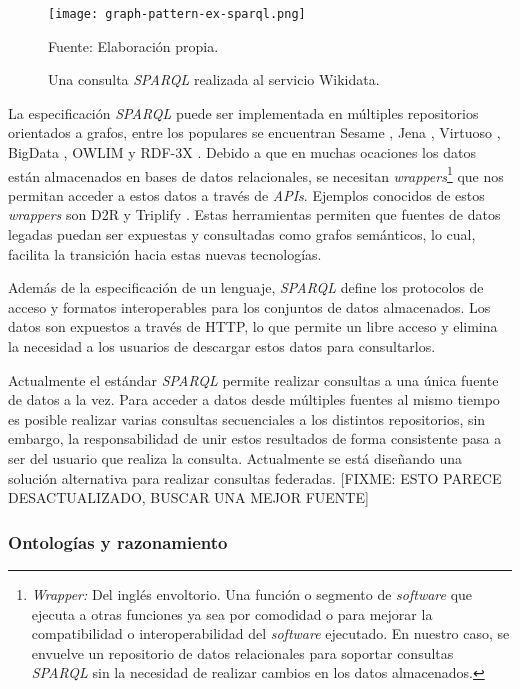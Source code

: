 \begin{figure}
    \centering
    \texttt{[image: graph-pattern-ex-sparql.png]}
    \caption{Una consulta \textit{SPARQL} realizada al servicio Wikidata.}
    Fuente: Elaboración propia.
    \label{fig:graph-pattern-ex-sparql}
\end{figure}

La especificación \textit{SPARQL} puede ser implementada en múltiples
repositorios orientados a grafos, entre los populares se encuentran Sesame
\cite{broekstra2002sesame}, Jena \cite{mcbride2001jena}, Virtuoso
\cite{openlink2015virtuoso}, BigData \cite{thompson2016bigdata}, OWLIM
\cite{kiryakov2005owlim} y RDF-3X \cite{neumann2010rdf}. Debido a que en muchas
ocaciones los datos están almacenados en bases de datos relacionales, se
necesitan \textit{wrappers}\footnote{\textit{Wrapper:} Del inglés envoltorio.
Una función o segmento de \textit{software} que ejecuta a otras funciones ya sea
por comodidad o para mejorar la compatibilidad o interoperabilidad del
\textit{software} ejecutado. En nuestro caso, se envuelve un repositorio de
datos relacionales para soportar consultas \textit{SPARQL} sin la necesidad de
realizar cambios en los datos almacenados.} que nos permitan acceder a estos
datos a través de \textit{APIs}. Ejemplos conocidos de estos \textit{wrappers}
son D2R \cite{bizer2006d2r} y Triplify \cite{auer2009triplify}. Estas
herramientas permiten que fuentes de datos legadas puedan ser expuestas y
consultadas como grafos semánticos, lo cual, facilita la transición hacia estas
nuevas tecnologías.

Además de la especificación de un lenguaje, \textit{SPARQL} define los
protocolos de acceso y formatos interoperables para los conjuntos de datos
almacenados. Los datos son expuestos a través de HTTP, lo que permite un libre
acceso y elimina la necesidad a los usuarios de descargar estos datos para
consultarlos.

Actualmente el estándar \textit{SPARQL} permite realizar consultas a una única
fuente de datos a la vez. Para acceder a datos desde múltiples fuentes al mismo
tiempo es posible realizar varias consultas secuenciales a los distintos
repositorios, sin embargo, la responsabilidad de unir estos resultados de forma
consistente pasa a ser del usuario que realiza la consulta. Actualmente se está
diseñando una solución alternativa para realizar consultas federadas. [FIXME:
ESTO PARECE DESACTUALIZADO, BUSCAR UNA MEJOR FUENTE]

\subsubsection{Ontologías y razonamiento}
\label{sec:ontologia-y-razonamiento}

